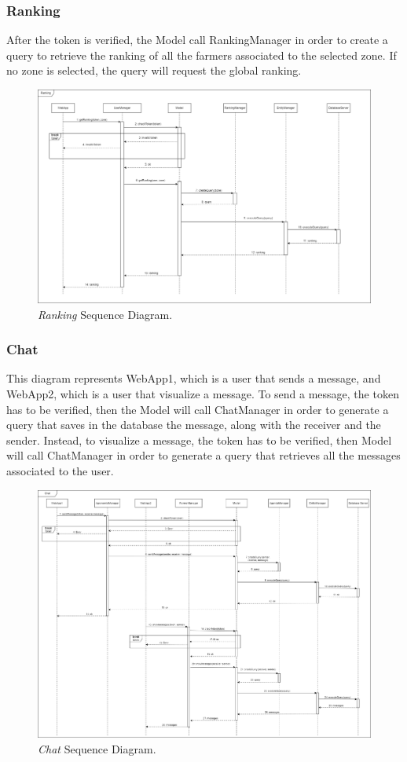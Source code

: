 \subsubsection{Ranking}
After the token is verified, the Model call RankingManager in order to create a query to retrieve the ranking of all the farmers associated to the selected zone. If no zone is selected, the query will request the global ranking.
\begin{figure}[H]
    \centering
    \includegraphics[width=\textwidth]{Images/Sequence Diagram/Ranking.png}
    \caption{\textit{Ranking} Sequence Diagram.}
\end{figure}
\newpage
\subsubsection{Chat}
This diagram represents WebApp1, which is a user that sends a message, and WebApp2, which is a user that visualize a message.
To send a message, the token has to be verified, then the Model will call ChatManager in order to generate a query that saves in the database the message, along with the receiver and the sender.
Instead, to visualize a message, the token has to be verified, then Model will call ChatManager in order to generate a query that retrieves all the messages associated to the user.
\begin{figure}[H]
    \centering
    \includegraphics[width=\textwidth]{Images/Sequence Diagram/Chat.png}
    \caption{\textit{Chat} Sequence Diagram.}
\end{figure}
\newpage

